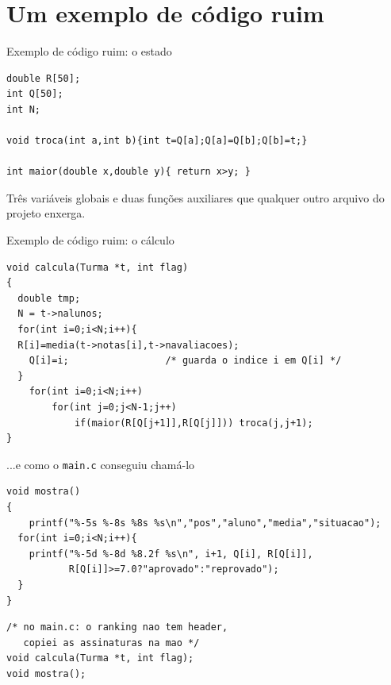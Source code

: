 \documentclass[aspectratio=169]{beamer}
\begin{document}
\section{Um exemplo de código ruim}

\begin{frame}[fragile]{Exemplo de código ruim: o estado}
\begin{lstlisting}[style=tinyC]
double R[50];
int Q[50];
int N;

void troca(int a,int b){int t=Q[a];Q[a]=Q[b];Q[b]=t;}

int maior(double x,double y){ return x>y; }
\end{lstlisting}
  \begin{block}{}
    \small Três variáveis globais e duas funções auxiliares que qualquer
    outro arquivo do projeto enxerga.
  \end{block}
\end{frame}

\begin{frame}[fragile]{Exemplo de código ruim: o cálculo}
\begin{lstlisting}[style=tinyC]
void calcula(Turma *t, int flag)
{
  double tmp;
  N = t->nalunos;
  for(int i=0;i<N;i++){
  R[i]=media(t->notas[i],t->navaliacoes);
    Q[i]=i;                 /* guarda o indice i em Q[i] */
  }
	for(int i=0;i<N;i++)
		for(int j=0;j<N-1;j++)
			if(maior(R[Q[j+1]],R[Q[j]])) troca(j,j+1);
}
\end{lstlisting}
\end{frame}

\begin{frame}[fragile]{...e como o \texttt{main.c} conseguiu chamá-lo}
\begin{lstlisting}[style=tinyC]
void mostra()
{
    printf("%-5s %-8s %8s %s\n","pos","aluno","media","situacao");
  for(int i=0;i<N;i++){
    printf("%-5d %-8d %8.2f %s\n", i+1, Q[i], R[Q[i]],
           R[Q[i]]>=7.0?"aprovado":"reprovado");
  }
}
\end{lstlisting}
\begin{lstlisting}[style=tinyC]
/* no main.c: o ranking nao tem header,
   copiei as assinaturas na mao */
void calcula(Turma *t, int flag);
void mostra();
\end{lstlisting}
\end{frame}
\end{document}
